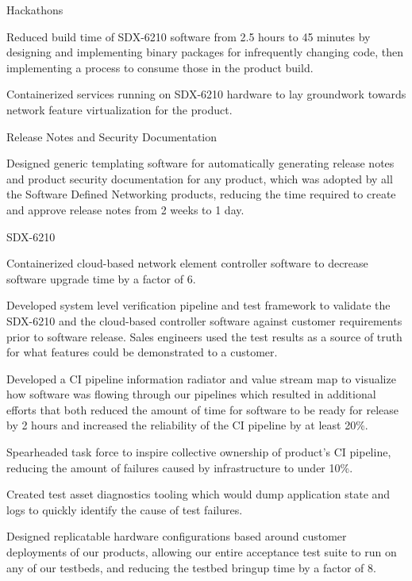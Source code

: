 
\begin{cventries}
  \cventry
    {} {Hackathons} {} {} {
      \begin{cvitems}
      \item {Reduced build time of SDX-6210 software from 2.5 hours to 45 minutes by designing and implementing binary packages for infrequently changing code, then implementing a process to consume those in the product build.}
      \item {Containerized services running on SDX-6210 hardware to lay groundwork towards network feature virtualization for the product.}
      \end{cvitems}
    }

  \cventry
    {} {Release Notes and Security Documentation} {} {} {
      \begin{cvitems}
        \item {Designed generic templating software for automatically generating release notes and product security documentation for any product, which was adopted by all the Software Defined Networking products, reducing the time required to create and approve release notes from 2 weeks to 1 day.}
      \end{cvitems}
    }

  \cventry
    {} {SDX-6210} {} {} {
      \begin{cvitems} %
        \item {Containerized cloud-based network element controller software to decrease software upgrade time by a factor of 6.}
        \item {Developed system level verification pipeline and test framework to validate the SDX-6210 and the cloud-based controller software against customer requirements prior to software release. Sales engineers used the test results as a source of truth for what features could be demonstrated to a customer.}
        \item {Developed a CI pipeline information radiator and value stream map to visualize how software was flowing through our pipelines which resulted in additional efforts that both reduced the amount of time for software to be ready for release by 2 hours and increased the reliability of the CI pipeline by at least 20\%.}
        \item {Spearheaded task force to inspire collective ownership of product's CI pipeline, reducing the amount of failures caused by infrastructure to under 10\%.}
        \item {Created test asset diagnostics tooling which would dump application state and logs to quickly identify the cause of test failures.}
        \item {Designed replicatable hardware configurations based around customer deployments of our products, allowing our entire acceptance test suite to run on any of our testbeds, and reducing the testbed bringup time by a factor of 8.}
      \end{cvitems}
    }


\end{cventries}

